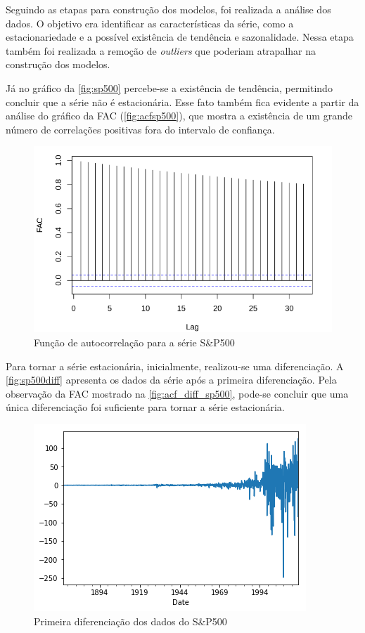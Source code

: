 \documentclass[
    12pt,
    oneside,
    a4paper,
    english,
    brazil
]{abntex2}
\begin{document}
Seguindo as  etapas para construção  dos modelos,  foi realizada a  análise dos
dados.  O  objetivo  era  identificar  as  características  da  série,  como  a
estacionariedade e  a possível  existência de  tendência e  sazonalidade. Nessa
etapa  também  foi  realizada  a  remoção  de  \textit{outliers}  que  poderiam
atrapalhar na construção dos modelos.

Já  no gráfico  da \autoref{fig:sp500}  percebe-se a  existência de  tendência,
permitindo  concluir que  a série  não é  estacionária. Esse  fato também  fica
evidente a  partir da análise  do gráfico da FAC  (\autoref{fig:acfsp500}), que
mostra  a existência  de  um grande  número de  correlações  positivas fora  do
intervalo de confiança.

\begin{figure}[ht]
    \centering
    \caption{Função de autocorrelação para a série S\&P500}\label{fig:acfsp500}
    \includegraphics[width=.5\linewidth]{images/SP500_FAC.png}
\end{figure}

Para tornar a série  estacionária, inicialmente, realizou-se uma diferenciação.
A  \autoref{fig:sp500diff}  apresenta  os  dados   da  série  após  a  primeira
diferenciação. Pela observação da FAC mostrado na \autoref{fig:acf_diff_sp500},
pode-se concluir que uma única diferenciação foi suficiente para tornar a série
estacionária.

\begin{figure}[ht]
    \centering
    \caption{Primeira diferenciação dos dados do S\&P500}\label{fig:sp500diff}
    \includegraphics[width=.5\linewidth]{images/sp500diff.png}
\end{figure}
\end{document}
